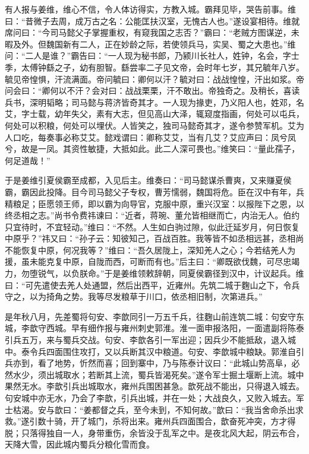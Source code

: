 有人报与姜维，维心不信，令人体访得实，方教入城。霸拜见毕，哭告前事。维曰：“昔微子去周，成万古之名：公能匡扶汉室，无愧古人也。”遂设宴相待。维就席问曰：“今司马懿父子掌握重权，有窥我国之志否？”霸曰：“老贼方图谋逆，未暇及外。但魏国新有二人，正在妙龄之际，若使领兵马，实吴、蜀之大患也。”维问：“二人是谁？”霸告曰：“一人现为秘书郎，乃颍川长社人，姓钟，名会，字士季，太傅钟繇之子，幼有胆智。繇尝率二子见文帝，会时年七岁，其兄毓年八岁。毓见帝惶惧，汗流满面。帝问毓曰：卿何以汗？毓对曰：战战惶惶，汗出如浆。帝问会曰：“卿何以不汗？会对曰：战战栗栗，汗不敢出。帝独奇之。及稍长，喜读兵书，深明韬略；司马懿与蒋济皆奇其才。一人现为掾吏，乃义阳人也，姓邓，名艾，字士载，幼年失父，素有大志，但见高山大泽，辄窥度指画，何处可以屯兵，何处可以积粮，何处可以埋伏。人皆笑之，独司马懿奇其才，遂令参赞军机。艾为人口吃，每奏事必称艾艾。懿戏谓曰：卿称艾艾，当有几艾？艾应声曰：凤兮凤兮，故是一凤。其资性敏捷，大抵如此。此二人深可畏也。”维笑曰：“量此孺子，何足道哉！”

于是姜维引夏侯霸至成都，入见后主。维奏曰：“司马懿谋杀曹爽，又来赚夏侯霸，霸因此投降。目今司马懿父子专权，曹芳懦弱，魏国将危。臣在汉中有年，兵精粮足；臣愿领王师，即以霸为向导官，克服中原，重兴汉室：以报陛下之恩，以终丞相之志。”尚书令费祎谏曰：“近者，蒋琬、董允皆相继而亡，内治无人。伯约只宜待时，不宜轻动。”维曰：“不然。人生如白驹过隙，似此迁延岁月，何日恢复中原乎？”祎又曰：“孙子云：知彼知己，百战百胜。我等皆不如丞相远甚，丞相尚不能恢复中原，何况我等？”维曰：“吾久居陇上，深知羌人之心；今若结羌人为援，虽未能克复中原，自陇而西，可断而有也。”后主曰：“卿既欲伐魏，可尽忠竭力，勿堕锐气，以负朕命。”于是姜维领敕辞朝，同夏侯霸径到汉中，计议起兵。维曰：“可先遣使去羌人处通盟，然后出西平，近雍州。先筑二城于麴山之下，令兵守之，以为掎角之势。我等尽发粮草于川口，依丞相旧制，次第进兵。”

是年秋八月，先差蜀将句安、李歆同引一万五千兵，往麴山前连筑二城：句安守东城，李歆守西城。早有细作报与雍州刺史郭淮。淮一面申报洛阳，一面遣副将陈泰引兵五万，来与蜀兵交战。句安、李歆各引一军出迎；因兵少不能抵敌，退入城中。泰令兵四面围住攻打，又以兵断其汉中粮道。句安、李歆城中粮缺。郭淮自引兵亦到，看了地势，忻然而喜；回到寨中，乃与陈泰计议曰：“此城山势高阜，必然水少，须出城取水；若断其上流，蜀兵皆渴死矣。”遂令军士掘土堰断上流。城中果然无水。李歆引兵出城取水，雍州兵围困甚急。歆死战不能出，只得退入城去。句安城中亦无水，乃会了李歆，引兵出城，并在一处；大战良久，又败入城去。军士枯渴。安与歆曰：“姜都督之兵，至今未到，不知何故。”歆曰：“我当舍命杀出求救。”遂引数十骑，开了城门，杀将出来。雍州兵四面围合，歆奋死冲突，方才得脱；只落得独自一人，身带重伤，余皆没于乱军之中。是夜北风大起，阴云布合，天降大雪，因此城内蜀兵分粮化雪而食。


